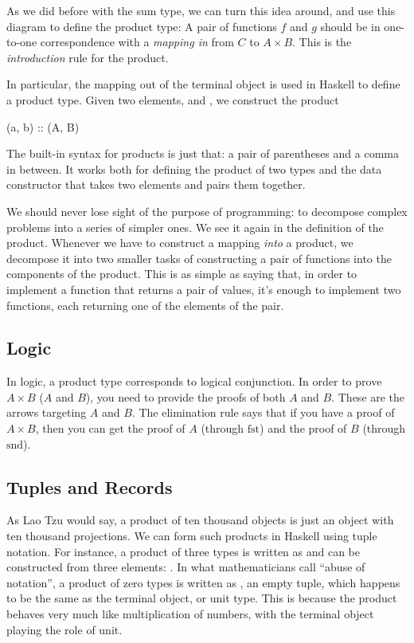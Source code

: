 \documentclass[DaoFP]{subfiles}
\begin{document}
As we did before with the sum type, we can turn this idea around, and use this diagram to define the product type: A pair of functions $f$ and $g$ should be in one-to-one correspondence with a \emph{mapping in} from $C$ to $A \times B$. This is the \emph{introduction} rule for the product.

In particular, the mapping out of the terminal object is used in Haskell to define a product type. Given two elements,  and , we construct the product 

\begin{haskell}
(a, b) :: (A, B)
\end{haskell}
The built-in syntax for products is just that: a pair of parentheses and a comma in between. It works both for defining the product of two types  and the data constructor  that takes two elements and pairs them together. 

We should never lose sight of the purpose of programming: to decompose complex problems into a series of simpler ones. We see it again in the definition of the product. Whenever we have to construct a mapping \emph{into} a product, we decompose it into two smaller tasks of constructing a pair of functions into the components of the product. This is as simple as saying that, in order to implement a function that returns a pair of values, it's enough to implement two functions, each returning one of the elements of the pair.

\subsection{Logic}

In logic, a product type corresponds to logical conjunction. In order to prove $A \times B$ ($A$ and $B$), you need to provide the proofs of both $A$ and $B$. These are the arrows targeting $A$ and $B$. The elimination rule says that if you have a proof of $A \times B$, then you can get the proof of $A$ (through $\text{fst}$) and the proof of $B$ (through $\text{snd}$).

\subsection{Tuples and Records}

As Lao Tzu would say, a product of ten thousand objects is just an object with ten thousand projections. We can form such products in Haskell using tuple notation. For instance, a product of three types is written as  and can be constructed from three elements: . In what mathematicians call ``abuse of notation'', a product of zero types is written as \hask{()}, an empty tuple, which happens to be the same as the terminal object, or unit type. This is because the product behaves very much like multiplication of numbers, with the terminal object playing the role of unit.
\end{document}
